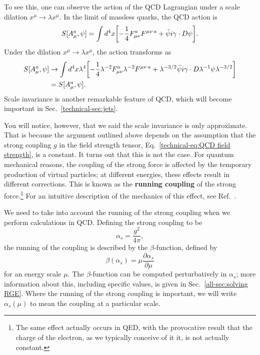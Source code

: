 \documentclass[../thesis.tex]{subfiles}
\begin{document}
	To see this, one can observe the action of the QCD Lagrangian under a scale dilation $x^\mu \to \lambda x^\mu$. In the limit of massless quarks, the QCD action is \cite{larkoski_elementary_2019-1}
	\begin{equation}
		S[A_\mu^a, \psi] = \int d^4 x \qty[-\frac{1}{4} F^a_{\mu \nu}F^{\mu\nu\,a} + \bar\psi i \gamma \cdot D \psi].
	\end{equation}
	Under the dilation $x^\mu \to \lambda x^\mu$, the action transforms as \cite{larkoski_elementary_2019-1}
	\begin{equation}
	\begin{aligned}
		S[A^a_\mu, \psi] &\to \int d^{4}x \lambda^4 \qty[-\frac{1}{4} \lambda^{-2} F^{a}_{\mu\nu}\lambda^{-2}F^{\mu\nu\,a} + \lambda^{-3/2}\bar \psi i \gamma \cdot D \lambda^{-1} \psi \lambda^{-3/2}] \\
		&= S[A_\mu^a, \psi].
	\end{aligned}
	\end{equation}
	Scale invariance is another remarkable feature of QCD, which will become important in Sec.~\ref{technical-sec:jets}.

	You will notice, however, that we said the scale invariance is only approximate. That is because the argument outlined above depends on the assumption that the strong coupling $g$ in the field strength tensor, Eq.~\ref{technical-eq:QCD field strength}, is a constant. It turns out that this is not the case. For quantum mechanical reasons, the coupling of the strong force is affected by the temporary production of virtual particles; at different energies, these effects result in different corrections. This is known as the \textbf{running coupling} of the strong force.\footnote{The same effect actually occurs in QED, with the provocative result that the charge of the electron, as we typically conceive of it it, is not actually constant.} For an intuitive description of the mechanics of this effect, see Ref.~\cite{larkoski_elementary_2019-1}.

	We need to take into account the running of the strong coupling when we perform calculations in QCD. Defining the strong coupling to be
	\begin{equation}
		\alpha_s = \frac{g^2}{4\pi},
	\end{equation}
	the running of the coupling is described by the $\beta$-function, defined by \cite{larkoski_elementary_2019-1}
	\begin{equation}
		\beta(\alpha_s) = \mu \frac{\partial \alpha_s}{\partial \mu}
	\end{equation}
	for an energy scale $\mu$. The $\beta$-function can be computed perturbatively in $\alpha_s$; more information about this, including specific values, is given in Sec.~\ref{all-sec:solving RGE}. Where the running of the strong coupling is important, we will write $\alpha_s(\mu)$ to mean the coupling at a particular scale.
\end{document}
